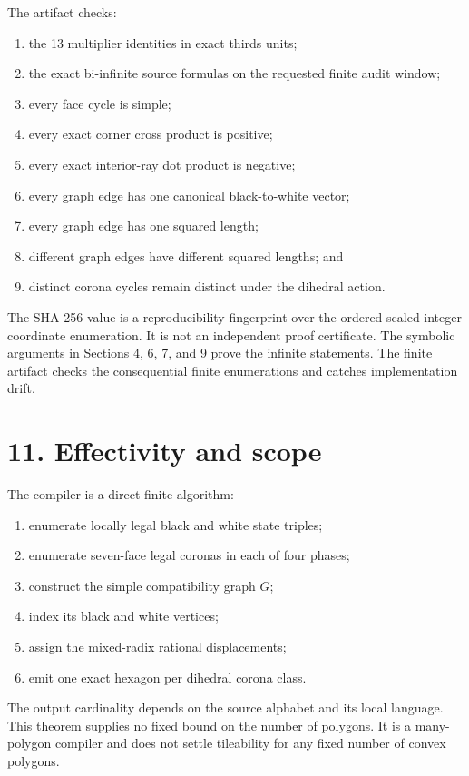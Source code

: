 \documentclass[11pt]{article}
\begin{document}
The artifact checks:

\begin{enumerate}
\item the 13 multiplier identities in exact thirds units;
\item the exact bi-infinite source formulas on the requested finite audit
   window;
\item every face cycle is simple;
\item every exact corner cross product is positive;
\item every exact interior-ray dot product is negative;
\item every graph edge has one canonical black-to-white vector;
\item every graph edge has one squared length;
\item different graph edges have different squared lengths; and
\item distinct corona cycles remain distinct under the dihedral action.
\end{enumerate}

The SHA-256 value is a reproducibility fingerprint over the ordered
scaled-integer coordinate enumeration. It is not an independent proof
certificate. The symbolic arguments in Sections 4, 6, 7, and 9 prove the
infinite statements. The finite artifact checks the consequential finite
enumerations and catches implementation drift.

\section*{11. Effectivity and scope}

The compiler is a direct finite algorithm:

\begin{enumerate}
\item enumerate locally legal black and white state triples;
\item enumerate seven-face legal coronas in each of four phases;
\item construct the simple compatibility graph \(G\);
\item index its black and white vertices;
\item assign the mixed-radix rational displacements;
\item emit one exact hexagon per dihedral corona class.
\end{enumerate}

The output cardinality depends on the source alphabet and its local language.
This theorem supplies no fixed bound on the number of polygons. It is a
many-polygon compiler and does not settle tileability for any fixed number
of convex polygons.
\end{document}
